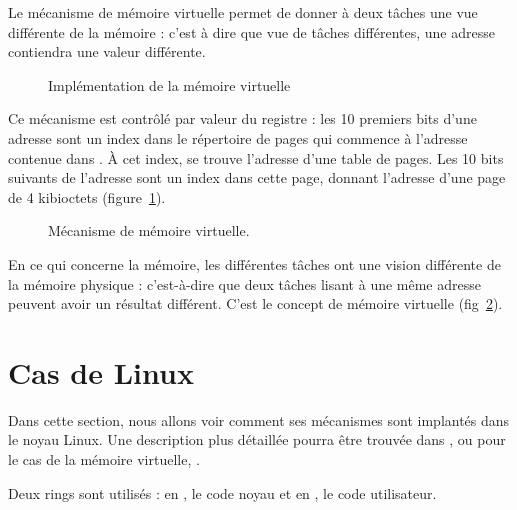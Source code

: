 Le mécanisme de mémoire virtuelle permet de donner à deux tâches une vue
différente de la mémoire : c'est à dire que vue de tâches différentes, une
adresse contiendra une valeur différente.

\begin{figure}

\caption{Implémentation de la mémoire virtuelle}
\label{fig:pagetables}
\end{figure}

Ce mécanisme est contrôlé par valeur du registre \crtrois : les 10 premiers bits
d'une adresse sont un index dans le répertoire de pages qui commence à l'adresse
contenue dans \crtrois. À cet index, se trouve l'adresse d'une table de pages.
Les 10 bits suivants de l'adresse sont un index dans cette page, donnant
l'adresse d'une page de 4 kibioctets (figure~\ref{fig:pagetables}).

\begin{figure} %
\centering
{}
\caption{Mécanisme de mémoire virtuelle.}
\label{fig:memoire-virtuelle}
\end{figure} %

En ce qui concerne la mémoire, les différentes tâches ont une vision différente
de la mémoire physique : c'est-à-dire que deux tâches lisant à une même adresse
peuvent avoir un résultat différent. C'est le concept de mémoire virtuelle
(fig~\ref{fig:memoire-virtuelle}).

\section{Cas de Linux}

Dans cette section, nous allons voir comment ses mécanismes sont implantés dans
le noyau Linux. Une description plus détaillée pourra être trouvée dans
\cite{UnderstandingTheLinuxKernel}, ou pour le cas de la mémoire virtuelle,
\cite{LinuxVMM}.

Deux rings sont utilisés : en , le code noyau et en , le code
utilisateur.

